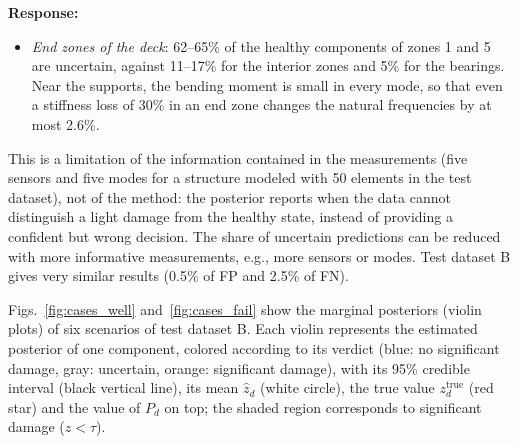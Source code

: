\documentclass[11pt]{article}
\newenvironment{response}{\par\smallskip\noindent\color{resp}\textbf{Response:}\ }{\par}
\begin{document}
\begin{response}
\begin{itemize}[leftmargin=*]
	\item \emph{End zones of the deck}: 62--65\% of the healthy components of zones 1 and 5 are uncertain, against 11--17\% for the interior zones and 5\% for the bearings. Near the supports, the bending moment is small in every mode, so that even a stiffness loss of 30\% in an end zone changes the natural frequencies by at most 2.6\%.
\end{itemize}
This is a limitation of the information contained in the measurements (five sensors and five modes for a structure modeled with 50 elements in the test dataset), not of the method: the posterior reports when the data cannot distinguish a light damage from the healthy state, instead of providing a confident but wrong decision.
The share of uncertain predictions can be reduced with more informative measurements, e.g., more sensors or modes.
Test dataset B gives very similar results (0.5\% of FP and 2.5\% of FN).

Figs.~\ref{fig:cases_well} and~\ref{fig:cases_fail} show the marginal posteriors (violin plots) of six scenarios of test dataset B.
Each violin represents the estimated posterior of one component, colored according to its verdict (blue: no significant damage, gray: uncertain, orange: significant damage), with its 95\% credible interval (black vertical line), its mean $\hat z_d$ (white circle), the true value $z_d^{\text{true}}$ (red star) and the value of $P_d$ on top; the shaded region corresponds to significant damage ($z<\tau$).


\end{response}
\end{document}
